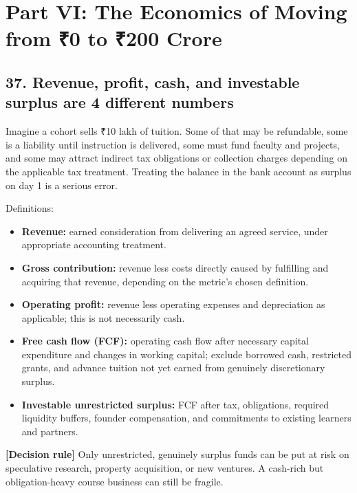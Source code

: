 
\section*{Part VI: The Economics of Moving from \textnormal{₹}0 to \textnormal{₹}200 Crore}

\subsection{37. Revenue, profit, cash, and investable surplus are 4 different numbers}

Imagine a cohort sells \textnormal{₹}10 lakh of tuition. Some of that may be refundable, some is a liability until instruction is delivered, some must fund faculty and projects, and some may attract indirect tax obligations or collection charges depending on the applicable tax treatment. Treating the balance in the bank account as surplus on day 1 is a serious error.

Definitions:

\begin{itemize}[leftmargin=*,itemsep=1.5pt]
  \item \textbf{Revenue:} earned consideration from delivering an agreed service, under appropriate accounting treatment.
  \item \textbf{Gross contribution:} revenue less costs directly caused by fulfilling and acquiring that revenue, depending on the metric's chosen definition.
  \item \textbf{Operating profit:} revenue less operating expenses and depreciation as applicable; this is not necessarily cash.
  \item \textbf{Free cash flow (FCF):} operating cash flow after necessary capital expenditure and changes in working capital; exclude borrowed cash, restricted grants, and advance tuition not yet earned from genuinely discretionary surplus.
  \item \textbf{Investable unrestricted surplus:} FCF after tax, obligations, required liquidity buffers, founder compensation, and commitments to existing learners and partners.
\end{itemize}

\textbf{\textbf{[Decision rule]}} Only unrestricted, genuinely surplus funds can be put at risk on speculative research, property acquisition, or new ventures. A cash-rich but obligation-heavy course business can still be fragile.

